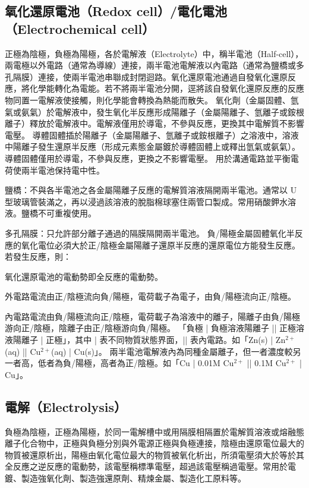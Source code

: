 \documentclass[a4paper,12pt]{article}
\begin{document}
\subsection{氧化還原電池（Redox cell）/電化電池（Electrochemical cell）}
正極為陰極，負極為陽極，各於電解液（Electrolyte）中，稱半電池（Half-cell），兩電極以外電路（通常為導線）連接，兩半電池電解液以內電路（通常為鹽橋或多孔隔膜）連接，使兩半電池串聯成封閉迴路。氧化還原電池通過自發氧化還原反應，將化學能轉化為電能。若不將兩半電池分開，逕將該自發氧化還原反應的反應物同置一電解液使接觸，則化學能會轉換為熱能而散失。
氧化劑（金屬固體、氫氣或氨氣）於電解液中，發生氧化半反應形成陽離子（金屬陽離子、氫離子或銨根離子）釋放於電解液中。電解液僅用於導電，不參與反應，更換其中電解質不影響電壓。
導體固體插於陽離子（金屬陽離子、氫離子或銨根離子）之溶液中，溶液中陽離子發生還原半反應（形成元素態金屬鍍於導體固體上或釋出氫氣或氨氣）。導體固體僅用於導電，不參與反應，更換之不影響電壓。
用於溝通電路並平衡電荷使兩半電池保持電中性。
\bit
\item 鹽橋：不與各半電池之各金屬陽離子反應的電解質溶液隔開兩半電池。通常以 U 型玻璃管裝滿之，再以浸過該溶液的脫脂棉球塞住兩管口製成。常用硝酸鉀水溶液。鹽橋不可重複使用。
\item 多孔隔膜：只允許部分離子通過的隔膜隔開兩半電池。
\eit
{}
負/陽極金屬固體氧化半反應的氧化電位必須大於正/陰極金屬陽離子還原半反應的還原電位方能發生反應。若發生反應，則：
\bit
\item 氧化還原電池的電動勢即全反應的電動勢。
\item 外電路電流由正/陰極流向負/陽極，電荷載子為電子，由負/陽極流向正/陰極。
\item 內電路電流由負/陽極流向正/陰極，電荷載子為溶液中的離子，陽離子由負/陽極游向正/陰極，陰離子由正/陰極游向負/陽極。
\eit
{}
「負極 | 負極溶液陽離子 || 正極溶液陽離子 | 正極」，其中 | 表不同物質狀態界面，|| 表內電路。如「Zn(s) | Zn$^{2+}$(aq) || Cu$^{2+}$(aq) | Cu(s)」。
兩半電池電解液內為同種金屬離子，但一者濃度較另一者高，低者為負/陽極，高者為正/陰極。如「Cu | 0.01M Cu$^{2+}$ || 0.1M Cu$^{2+}$ | Cu」。
\subsection{電解（Electrolysis）}
負極為陰極，正極為陽極，於同一電解槽中或用隔膜相隔置於電解質溶液或熔融態離子化合物中，正極與負極分別與外電源正極與負極連接，陰極由還原電位最大的物質被還原析出，陽極由氧化電位最大的物質被氧化析出，所須電壓須大於等於其全反應之逆反應的電動勢，該電壓稱標準電壓，超過該電壓稱過電壓。常用於電鍍、製造強氧化劑、製造強還原劑、精煉金屬、製造化工原料等。
\end{document}
